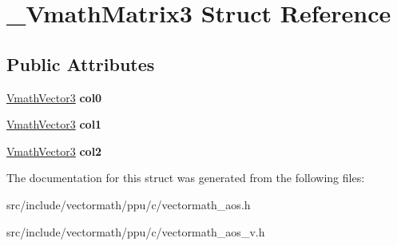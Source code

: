 \hypertarget{struct__VmathMatrix3}{\section{\-\_\-\-Vmath\-Matrix3 Struct Reference}
\label{struct__VmathMatrix3}
}
\subsection*{Public Attributes}
\begin{DoxyCompactItemize}
\item 
\hypertarget{struct__VmathMatrix3_a2920e9eb5da6c99b5620f3ecd2f83e71}{\hyperlink{struct__VmathVector3}{Vmath\-Vector3} {\bfseries col0}}\label{struct__VmathMatrix3_a2920e9eb5da6c99b5620f3ecd2f83e71}

\item 
\hypertarget{struct__VmathMatrix3_af8e736078a6351bd5b20f6f55864f373}{\hyperlink{struct__VmathVector3}{Vmath\-Vector3} {\bfseries col1}}\label{struct__VmathMatrix3_af8e736078a6351bd5b20f6f55864f373}

\item 
\hypertarget{struct__VmathMatrix3_aa5e81c0a4d79f8e6bb576f89ee2eef81}{\hyperlink{struct__VmathVector3}{Vmath\-Vector3} {\bfseries col2}}\label{struct__VmathMatrix3_aa5e81c0a4d79f8e6bb576f89ee2eef81}

\end{DoxyCompactItemize}


The documentation for this struct was generated from the following files\-:\begin{DoxyCompactItemize}
\item 
src/include/vectormath/ppu/c/vectormath\-\_\-aos.\-h\item 
src/include/vectormath/ppu/c/vectormath\-\_\-aos\-\_\-v.\-h\end{DoxyCompactItemize}
